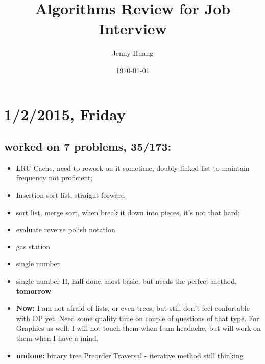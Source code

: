 \documentclass[9pt,b5paper]{article}
\author{Jenny Huang}
\date{\today}
\title{Algorithms Review for Job Interview}
\begin{document}
\maketitle
\tableofcontents


\section{1/2/2015, Friday}
\label{sec-1}
\subsection{worked on 7 problems, 35/173:}
\label{sec-1-1}
\begin{itemize}
\item LRU Cache, need to rework on it sometime, doubly-linked list to maintain frequency not proficient;
\item Insertion sort list, straight forward
\item sort list, merge sort, when break it down into pieces, it's not that hard;
\item evaluate reverse polish notation
\item gas station
\item single number
\item single number II, half done, most basic, but needs the perfect method, \textbf{tomorrow}
\item \textbf{Now:} I am not afraid of lists, or even trees, but still don't feel confortable with DP yet. Need some quality time on couple of questions of that type. For Graphics as well. I will not touch them when I am headache, but will work on them when I have a mind.
\item \textbf{undone:} binary tree Preorder Traversal - iterative method still thinking
\end{itemize}
\end{document}
